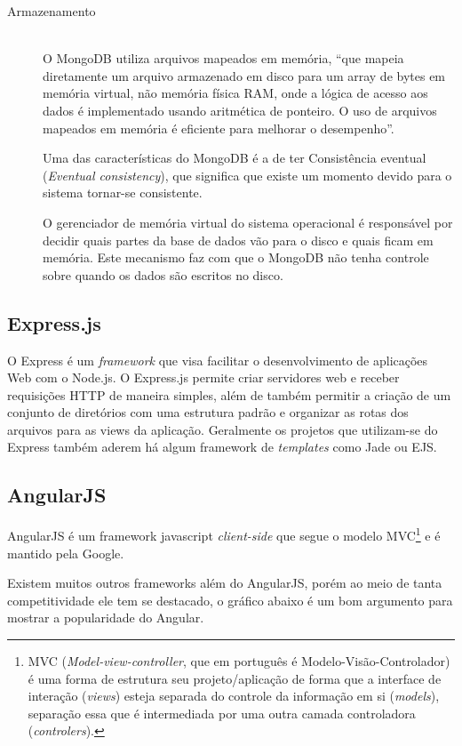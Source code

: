 \begin{description}
\item[Armazenamento] \hfill \\
O MongoDB utiliza arquivos mapeados em memória, ``que mapeia diretamente um arquivo armazenado em disco para um array de bytes em memória virtual, não memória física RAM, onde a lógica de acesso aos dados é implementado usando aritmética de ponteiro. O uso de arquivos mapeados em memória é eficiente para melhorar o desempenho''\cite{AnaliseNosql}.

Uma das características do MongoDB é a de ter Consistência eventual (\textit{Eventual consistency}), que significa que  existe um momento devido para o sistema tornar-se consistente. \cite{BaseAcid}

O gerenciador de memória virtual do sistema operacional é responsável por decidir quais partes da base de dados vão para o disco e quais ficam em memória. Este mecanismo faz com que o MongoDB não tenha controle sobre quando os dados são escritos no disco\cite{AnalysisNoSQL}.

\end{description}


\subsection{Express.js}
\label{subsec: Express.js}
O Express é um \textit{framework} que visa facilitar o desenvolvimento de aplicações Web com o Node.js. O Express.js permite criar servidores web e receber requisições HTTP de maneira simples, além de também permitir a criação de um conjunto de diretórios com uma estrutura padrão e organizar as rotas dos arquivos para as views da aplicação. Geralmente os projetos que utilizam-se do Express também aderem há algum framework de \textit{templates} como Jade ou EJS.

\subsection{AngularJS}
\label{subsec: AngularJS}
AngularJS é um framework javascript \textit{client-side} que segue o modelo MVC\footnote{MVC (\textit{Model-view-controller}, que em português é Modelo-Visão-Controlador) é uma forma de estrutura seu projeto/aplicação de forma que a interface de interação (\textit{views}) esteja separada do controle da informação em si (\textit{models}), separação essa que é intermediada por uma outra camada controladora (\textit{controlers}).} e é mantido pela Google.

Existem muitos outros frameworks além do AngularJS, porém ao meio de tanta competitividade ele tem se destacado, o gráfico abaixo é um bom argumento para mostrar a popularidade do Angular.

